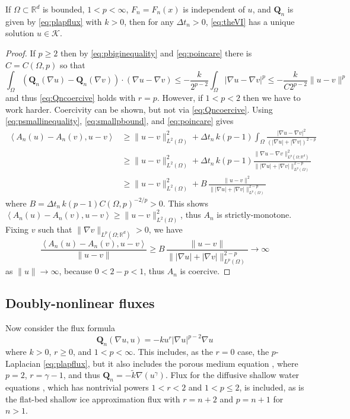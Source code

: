 \documentclass[final,onefignum]{siamart190516}
\newcommand\bQ{\mathbf{Q}}
\newcommand{\grad}{\nabla}
\newcommand{\ip}[2]{\ensuremath{\left<#1,#2\right>}}
\newcommand\RR{\mathbb{R}}
\begin{document}
\begin{theorem}  \label{thm:plapwellposed}  If $\Omega\subset \RR^d$ is bounded, $1<p<\infty$, $F_n=F_n(x)$ is independent of $u$, and $\bQ_n$ is given by \eqref{eq:plapflux} with $k>0$, then for any $\Delta t_n>0$, \eqref{eq:theVI} has a unique solution $u\in\mathcal{K}$.
\end{theorem}

\begin{proof} If $p\ge 2$ then by \eqref{eq:pbiginequality} and \eqref{eq:poincare} there is $C=C(\Omega,p)$ so that
    $$\int_\Omega \left(\bQ_n(\grad u) - \bQ_n(\grad v)\right)\cdot (\grad u - \grad v) \le - \frac{k}{2^{p-2}} \int_\Omega |\grad u - \grad v|^p \le - \frac{k}{C 2^{p-2}} \|u-v\|^p$$
and thus \eqref{eq:Qncoercive} holds with $r=p$.  However, if  $1<p<2$ then we have to work harder.  Coercivity can be shown, but not via \eqref{eq:Qncoercive}.  Using \eqref{eq:psmallinequality}, \eqref{eq:smallpbound}, and \eqref{eq:poincare} gives
\begin{align*}
\ip{A_n(u) - A_n(v)}{u-v} &\ge \|u-v\|_{L^2(\Omega)}^2 + \Delta t_n\,k (p-1) \int_\Omega \frac{|\grad u - \grad v|^2}{\left(|\grad u|+|\grad v|\right)^{2-p}} \\
  &\ge \|u-v\|_{L^2(\Omega)}^2 + \Delta t_n\,k (p-1) \frac{\|\grad u - \grad v\|_{L^p(\Omega; \RR^d)}^2}{\big\||\grad u|+|\grad v|\big\|_{L^p(\Omega)}^{2-p}} \\
  &\ge \|u-v\|_{L^2(\Omega)}^2 + B\, \frac{\|u - v\|^2}{\big\||\grad u|+|\grad v|\big\|_{L^p(\Omega)}^{2-p}}
\end{align*}
where $B = \Delta t_n\,k (p-1) C(\Omega,p)^{-2/p} >0$.  This shows $\ip{A_n(u) - A_n(v)}{u-v} \ge \|u-v\|_{L^2(\Omega)}^2$, thus $A_n$ is strictly-monotone.  Fixing $v$ such that $\|\grad v\|_{L^p(\Omega;\RR^d)} >0$, we have
\begin{equation*}
\frac{\ip{A_n(u) - A_n(v)}{u-v}}{\|u-v\|} \ge B\, \frac{\|u - v\|}{\big\||\grad u|+|\grad v|\big\|_{L^p(\Omega)}^{2-p}} \to \infty
\end{equation*}
as $\|u\|\to\infty$, because $0<2-p<1$, thus $A_n$ is coercive. \end{proof}

\subsection{Doubly-nonlinear fluxes} \label{subsec:powertransform}  Now consider the flux formula
\begin{equation}
  \bQ_n(\grad u,u) = - k u^r |\grad u|^{p-2} \grad u \label{eq:doubleflux}
\end{equation}
where $k>0$, $r\ge 0$, and $1<p<\infty$.  This includes, as the $r=0$ case, the $p$-Laplacian \eqref{eq:plapflux}, but it also includes the porous medium equation \cite{Vazquez2007}, where $p=2$, $r=\gamma-1$, and thus $\bQ_n = - \tilde k \grad(u^\gamma)$.  Flux for the diffusive shallow water equations \cite{AlonsoSantillanaDawson2008}, which has nontrivial powers $1<r<2$ and $1<p\le 2$, is included, as is the flat-bed shallow ice approximation \cite{CalvoDuranyVazquez2000} flux with $r=n+2$ and $p=n+1$ for $n>1$.
\end{document}
